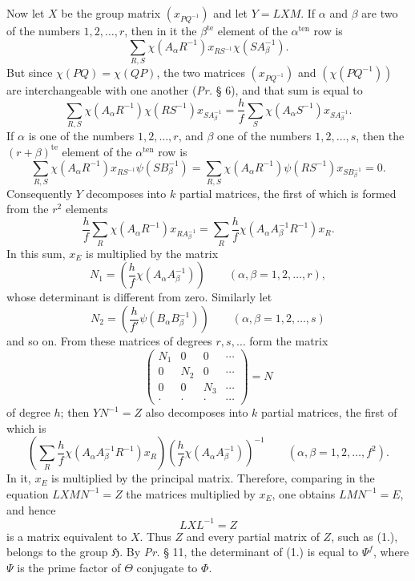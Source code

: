 \documentclass[11pt]{article}
\newcommand{\Hgrp}{\mathfrak{H}}
\newcommand{\ten}{\mathrm{ten}}
\newcommand{\te}{\mathrm{te}}
\begin{document}
Now let $X$ be the group matrix $(x_{PQ^{-1}})$ and let $Y=LXM$. If $\alpha$ and $\beta$ are two of the numbers $1,2,\ldots,r$, then in it the $\beta^{\te}$ element of the $\alpha^{\ten}$ row is
\[
\sum_{R,S}\chi(A_\alpha R^{-1})x_{RS^{-1}}\chi(SA_\beta^{-1}).
\]
But since $\chi(PQ)=\chi(QP)$, the two matrices $(x_{PQ^{-1}})$ and $(\chi(PQ^{-1}))$ are interchangeable with one another (\emph{Pr.} § 6), and that sum is equal to
\[
\sum_{R,S}\chi(A_\alpha R^{-1})\chi(RS^{-1})x_{SA_\beta^{-1}}=\frac{h}{f}\sum_S\chi(A_\alpha S^{-1})x_{SA_\beta^{-1}}.
\]
If $\alpha$ is one of the numbers $1,2,\ldots,r$, and $\beta$ one of the numbers $1,2,\ldots,s$, then the $(r+\beta)^{\te}$ element of the $\alpha^{\ten}$ row is
\[
\sum_{R,S}\chi(A_\alpha R^{-1})x_{RS^{-1}}\psi(SB_\beta^{-1})
=\sum_{R,S}\chi(A_\alpha R^{-1})\psi(RS^{-1})x_{SB_\beta^{-1}}=0.
\]
Consequently $Y$ decomposes into $k$ partial matrices, the first of which is formed from the $r^2$ elements
\[
\frac{h}{f}\sum_R\chi(A_\alpha R^{-1})x_{RA_\beta^{-1}}
=\sum_R\frac{h}{f}\chi(A_\alpha A_\beta^{-1}R^{-1})x_R.
\]
In this sum, $x_E$ is multiplied by the matrix
\[
N_1=\left(\frac{h}{f}\chi(A_\alpha A_\beta^{-1})\right)\qquad(\alpha,\beta=1,2,\ldots,r),
\]
whose determinant is different from zero. Similarly let
\[
N_2=\left(\frac{h}{f'}\psi(B_\alpha B_\beta^{-1})\right)\qquad(\alpha,\beta=1,2,\ldots,s)
\]
and so on. From these matrices of degrees $r,s,\ldots$ form the matrix
\[
\begin{pmatrix}
N_1&0&0&\cdots\\
0&N_2&0&\cdots\\
0&0&N_3&\cdots\\
\cdot&\cdot&\cdot&\cdots
\end{pmatrix}=N
\]
of degree $h$; then $YN^{-1}=Z$ also decomposes into $k$ partial matrices, the first of which is
\begin{equation}\tag{1.}
\left(\sum_R\frac{h}{f}\chi(A_\alpha A_\beta^{-1}R^{-1})x_R\right)
\left(\frac{h}{f}\chi(A_\alpha A_\beta^{-1})\right)^{-1}\qquad(\alpha,\beta=1,2,\ldots,f^2).
\end{equation}
In it, $x_E$ is multiplied by the principal matrix. Therefore, comparing in the equation $LXMN^{-1}=Z$ the matrices multiplied by $x_E$, one obtains $LMN^{-1}=E$, and hence
\begin{equation}\tag{2.}
LX L^{-1}=Z
\end{equation}
is a matrix equivalent to $X$. Thus $Z$ and every partial matrix of $Z$, such as (1.), belongs to the group $\Hgrp$. By \emph{Pr.} § 11, the determinant of (1.) is equal to $\Psi^f$, where $\Psi$ is the prime factor of $\Theta$ conjugate to $\Phi$.
\end{document}

